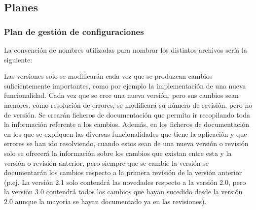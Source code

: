 \documentclass{article}
\begin{document}
\subsection{Planes}

\subsubsection{Plan de gestión de configuraciones}
La convención de nombres utilizadas para nombrar los distintos archivos sería la siguiente: 
\begin{figure}[H]
\end{figure}
Las versiones solo se modificarán cada vez que se produzcan cambios suficientemente importantes, como por ejemplo la implementación de una nueva funcionalidad. 
Cada vez que se cree una nueva versión, pero sus cambios sean menores, como resolución de errores, se modificará su número de revisión, pero no de versión. 
Se crearán ficheros de documentación que permita ir recopilando toda la información referente a los cambios.
Además, en los ficheros de documentación en los que se expliquen las diversas funcionalidades que tiene la aplicación y que errores se han ido resolviendo, cuando estos sean de una nueva versión o revisión solo se ofrecerá la información sobre los cambios que existan entre esta y la versión o revisión anterior, pero siempre que se cambie la versión se documentarán los cambios respecto a la primera revisión de la versión anterior (p.ej. La versión 2.1 solo contendrá las novedades respecto a la versión 2.0, pero la versión 3.0 contendrá todos los cambios que hayan sucedido desde la versión 2.0 aunque la mayoría se hayan documentado ya en las revisiones). 

\newpage
\end{document}

